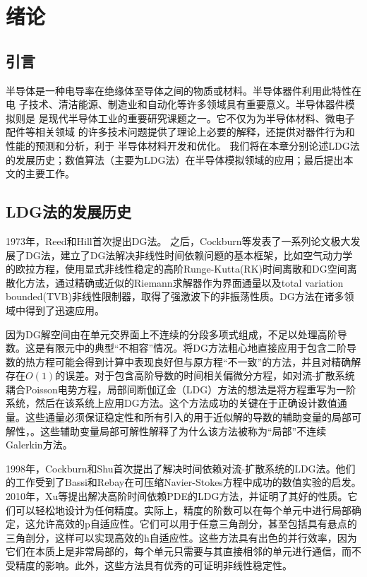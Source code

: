 \cleardoublepage

\section{绪论}

\subsection{引言}
半导体是一种电导率在绝缘体至导体之间的物质或材料。半导体器件利用此特性在电
子技术、清洁能源、制造业和自动化等许多领域具有重要意义。半导体器件模拟则是
是现代半导体工业的重要研究课题之一。它不仅为为半导体材料、微电子配件等相关领域
的许多技术问题提供了理论上必要的解释，还提供对器件行为和性能的预测和分析，利于
半导体材料开发和优化。
我们将在本章分别论述LDG法的发展历史；数值算法（主要为LDG法）在半导体模拟领域的应用；最后提出本文的主要工作。
\subsection{LDG法的发展历史}
1973年，Reed和Hill首次提出DG法\cite{reed1973triangular}。
之后，Cockburn等发表了一系列论文极大发展了DG法，建立了DG法解决非线性时间依赖问题的基本框架\cite{reed1973triangular,cockburn1991runge,cockburn1989tvb2,cockburn1989tvb3,cockburn1990runge,cockburn1998runge}，比如空气动力学的欧拉方程，使用显式非线性稳定的高阶Runge-Kutta(RK)时间离散和DG空间离散化方法，通过精确或近似的Riemann求解器作为界面通量以及total variation bounded(TVB)非线性限制器，取得了强激波下的非振荡性质。DG方法在诸多领域中得到了迅速应用\cite{cockburn2000development}。

因为DG解空间由在单元交界面上不连续的分段多项式组成，不足以处理高阶导数。这是有限元中的典型“不相容”情况。将DG方法粗心地直接应用于包含二阶导数的热方程可能会得到计算中表现良好但与原方程“不一致”的方法，并且对精确解存在$O(1)$的误差\cite{cockburn2001runge,zhang2003analysis}。对于包含高阶导数的时间相关偏微分方程，如对流-扩散系统耦合Poisson电势方程，局部间断伽辽金（LDG）方法的想法是将方程重写为一阶系统，然后在该系统上应用DG方法。这个方法成功的关键在于正确设计数值通量。这些通量必须保证稳定性和所有引入的用于近似解的导数的辅助变量的局部可解性，。这些辅助变量局部可解性解释了为什么该方法被称为“局部”不连续Galerkin方法\cite{cockburn1998local}。

1998年，Cockburn和Shu首次提出了解决时间依赖对流-扩散系统的LDG法\cite{cockburn1998local}。他们的工作受到了Bassi和Rebay在可压缩Navier-Stokes方程中成功的数值实验的启发\cite{bassi1997high}。2010年，Xu等提出解决高阶时间依赖PDE的LDG方法\cite{xu2010local}，并证明了其好的性质。它们可以轻松地设计为任何精度。实际上，精度的阶数可以在每个单元中进行局部确定，这允许高效的p自适应性。它们可以用于任意三角剖分，甚至包括具有悬点的三角剖分，这样可以实现高效的h自适应性。这些方法具有出色的并行效率，因为它们在本质上是非常局部的，每个单元只需要与其直接相邻的单元进行通信，而不受精度的影响。此外，这些方法具有优秀的可证明非线性稳定性。
